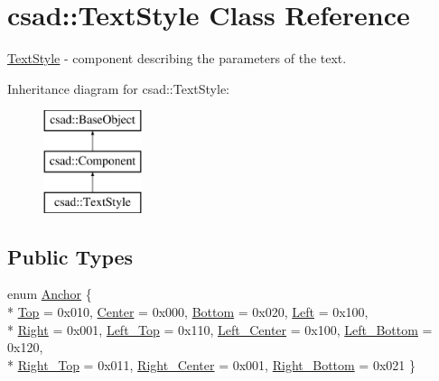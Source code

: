 \hypertarget{classcsad_1_1_text_style}{\section{csad\-:\-:Text\-Style Class Reference}
\label{classcsad_1_1_text_style}
}


\hyperlink{classcsad_1_1_text_style}{Text\-Style} -\/ component describing the parameters of the text.  


Inheritance diagram for csad\-:\-:Text\-Style\-:\begin{figure}[H]
\begin{center}
\leavevmode
\includegraphics[height=3.000000cm]{classcsad_1_1_text_style}
\end{center}
\end{figure}
\subsection*{Public Types}
\begin{DoxyCompactItemize}
\item 
enum \hyperlink{classcsad_1_1_text_style_aacdb2bdc2e607a6106be8120b932e47d}{Anchor} \{ \\*
\hyperlink{classcsad_1_1_text_style_aacdb2bdc2e607a6106be8120b932e47da763ab2a048994f7b96589a3d0f26d094}{Top} = 0x010, 
\hyperlink{classcsad_1_1_text_style_aacdb2bdc2e607a6106be8120b932e47da2361aedcdae29d6a4e4ab381f587cd0c}{Center} = 0x000, 
\hyperlink{classcsad_1_1_text_style_aacdb2bdc2e607a6106be8120b932e47da81e426475315efe4103acea301edb012}{Bottom} = 0x020, 
\hyperlink{classcsad_1_1_text_style_aacdb2bdc2e607a6106be8120b932e47da51aa1a1e321e5b6237aa59e65aecb1cf}{Left} = 0x100, 
\\*
\hyperlink{classcsad_1_1_text_style_aacdb2bdc2e607a6106be8120b932e47da6db0b3d20d2eb5faaa4a5f7cd675282f}{Right} = 0x001, 
\hyperlink{classcsad_1_1_text_style_aacdb2bdc2e607a6106be8120b932e47da9f825017d1633a4f44e96ad73023b067}{Left\-\_\-\-Top} = 0x110, 
\hyperlink{classcsad_1_1_text_style_aacdb2bdc2e607a6106be8120b932e47da01c6392be426c84ddfa59864178f7df4}{Left\-\_\-\-Center} = 0x100, 
\hyperlink{classcsad_1_1_text_style_aacdb2bdc2e607a6106be8120b932e47da976ad443e03acbc053c96d302048ecdd}{Left\-\_\-\-Bottom} = 0x120, 
\\*
\hyperlink{classcsad_1_1_text_style_aacdb2bdc2e607a6106be8120b932e47da22b03a7d736b6bacbcacc04b92483e35}{Right\-\_\-\-Top} = 0x011, 
\hyperlink{classcsad_1_1_text_style_aacdb2bdc2e607a6106be8120b932e47da6f79ccb724936f4a80d1ce1060623ad5}{Right\-\_\-\-Center} = 0x001, 
\hyperlink{classcsad_1_1_text_style_aacdb2bdc2e607a6106be8120b932e47da7afd942bb03db116f44e1995d92e259b}{Right\-\_\-\-Bottom} = 0x021
 \}
\end{DoxyCompactItemize}
